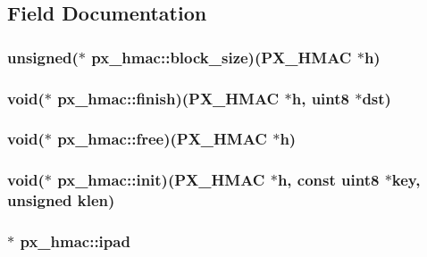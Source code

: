 \begin{DoxyCompactItemize}
\begin{tabbing}
\end{tabbing}\end{DoxyCompactItemize}


\subsection{Field Documentation}
\hypertarget{structpx__hmac_a633309528ca04e35bab8fc502ae96e99}{
\subsubsection[{block\-\_\-size}]{\setlength{\rightskip}{0pt plus 5cm}unsigned($\ast$ px\-\_\-hmac\-::block\-\_\-size)({\bf P\-X\-\_\-\-H\-M\-A\-C} $\ast$h)}}\label{structpx__hmac_a633309528ca04e35bab8fc502ae96e99}
\hypertarget{structpx__hmac_a5891604df1dcbc091bca70a4e6b041d8}{
\subsubsection[{finish}]{\setlength{\rightskip}{0pt plus 5cm}void($\ast$ px\-\_\-hmac\-::finish)({\bf P\-X\-\_\-\-H\-M\-A\-C} $\ast$h, {\bf uint8} $\ast$dst)}}\label{structpx__hmac_a5891604df1dcbc091bca70a4e6b041d8}
\hypertarget{structpx__hmac_aaec97ad622d5ef2ac7ab6b166bddc63a}{
\subsubsection[{free}]{\setlength{\rightskip}{0pt plus 5cm}void($\ast$ px\-\_\-hmac\-::free)({\bf P\-X\-\_\-\-H\-M\-A\-C} $\ast$h)}}\label{structpx__hmac_aaec97ad622d5ef2ac7ab6b166bddc63a}
\hypertarget{structpx__hmac_a67b9614118aa8555a07c89c59c5c75ac}{
\subsubsection[{init}]{\setlength{\rightskip}{0pt plus 5cm}void($\ast$ px\-\_\-hmac\-::init)({\bf P\-X\-\_\-\-H\-M\-A\-C} $\ast$h, const {\bf uint8} $\ast$key, unsigned klen)}}\label{structpx__hmac_a67b9614118aa8555a07c89c59c5c75ac}
\hypertarget{structpx__hmac_a234c1fdafd4a075f20669c23a1ccf025}{
\subsubsection[{ipad}]{$\ast$ px\-\_\-hmac\-::ipad}}\label{structpx__hmac_a234c1fdafd4a075f20669c23a1ccf025}
